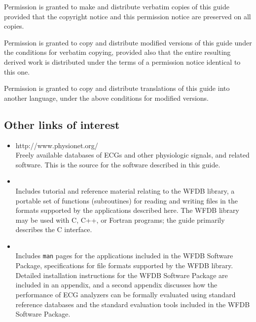 \documentclass[twoside]{book}
\begin{document}
\vspace{0.2 in}
\noindent
Permission is granted to make and distribute verbatim copies of this
guide provided that the copyright notice and this permission notice are
preserved on all copies.


\vspace{0.2 in}
\noindent
Permission is granted to copy and distribute modified versions of this
guide under the conditions for verbatim copying, provided also that the
entire resulting derived work is distributed under the terms of a
permission notice identical to this one.

\vspace{0.2 in}
\noindent
Permission is granted to copy and distribute translations of this guide
into another language, under the above conditions for modified versions.

\begin{htmlonly}
\section*{Other links of interest}

\begin{itemize}
\item
{}
{http://www.physionet.org/} \\
Freely available databases of ECGs and other physiologic signals,
and related software.  This is the source for the software described in this
guide.

\item
{} \\
Includes tutorial and reference material relating to the WFDB library,
a portable set of functions (subroutines) for reading and writing files in the
formats supported by the applications described here.  The WFDB library may be
used with C, C++, or Fortran programs;  the guide primarily describes the C
interface.

\item
{} \\
Includes {\tt man} pages for the applications included in the WFDB Software
Package, specifications for file formats supported by the WFDB library.  Detailed
installation instructions for the WFDB Software Package are included in an
appendix, and a second appendix discusses how the performance of ECG analyzers
can be formally evaluated using standard reference databases and the standard
evaluation tools included in the WFDB Software Package.
\end{itemize}
\end{htmlonly}
\newpage
\setcounter{page}{1}
\tableofcontents
\end{document}
